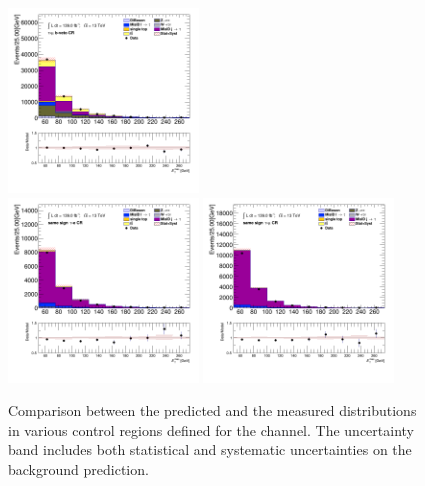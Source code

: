 \begin{figure}[!thp]
\begin{center}
			\includegraphics[width=0.45\textwidth]{chapters/chapter6_HPlus/images/taulep/met_et_TAUMU_BVETO.png} \\
			\includegraphics[width=0.45\textwidth]{chapters/chapter6_HPlus/images/taulep/met_et_SS_TAUEL.png} 
			\includegraphics[width=0.45\textwidth]{chapters/chapter6_HPlus/images/taulep/met_et_SS_TAUMU.png} \\
			\end{center}
			\caption{
			Comparison between the predicted and the measured \Etm distributions in various control regions defined for the \taulep channel. The uncertainty band includes both statistical and systematic uncertainties on the background prediction. 
			}
			\label{fig:bkg-met-taulep}
		\end{figure}

	\clearpage
